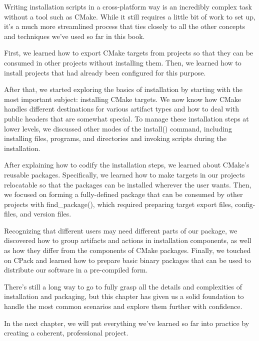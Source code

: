 Writing installation scripts in a cross-platform way is an incredibly complex task without a tool such as CMake. While it still requires a little bit of work to set up, it's a much more streamlined process that ties closely to all the other concepts and techniques we've used so far in this book.

First, we learned how to export CMake targets from projects so that they can be consumed in other projects without installing them. Then, we learned how to install projects that had already been configured for this purpose.

After that, we started exploring the basics of installation by starting with the most important subject: installing CMake targets. We now know how CMake handles different destinations for various artifact types and how to deal with public headers that are somewhat special. To manage these installation steps at lower levels, we discussed other modes of the install() command, including installing files, programs, and directories and invoking scripts during the installation.

After explaining how to codify the installation steps, we learned about CMake's reusable packages. Specifically, we learned how to make targets in our projects relocatable so that the packages can be installed wherever the user wants. Then, we focused on forming a fully-defined package that can be consumed by other projects with find\_package(), which required preparing target export files, config-files, and version files.

Recognizing that different users may need different parts of our package, we discovered how to group artifacts and actions in installation components, as well as how they differ from the components of CMake packages.
Finally, we touched on CPack and learned how to prepare basic binary packages that can be used to distribute our software in a pre-compiled form.

There's still a long way to go to fully grasp all the details and complexities of installation and packaging, but this chapter has given us a solid foundation to handle the most common scenarios and explore them further with confidence.

In the next chapter, we will put everything we've learned so far into practice by creating a coherent, professional project.








